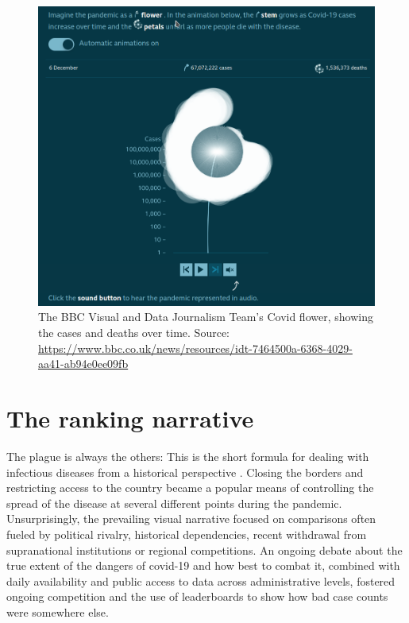 \documentclass[article]{jdssv}\usepackage[]{graphicx}\usepackage[]{xcolor}
\begin{document}
\begin{figure}
\centering
\includegraphics[width=.8\linewidth]{Figures_Web/BBC_flower_time_series}
\caption{The BBC Visual and Data Journalism Team's Covid flower, showing the cases and deaths over time. Source: \url{https://www.bbc.co.uk/news/resources/idt-7464500a-6368-4029-aa41-ab94e0ee09fb}}\label{fig:bbc-flower}
\end{figure}


\section{The ranking narrative}
\label{sec:rankings}

The plague is always the others: This is the short formula for dealing with infectious diseases from a historical perspective \citep{thiessen2021}. Closing the borders and restricting access to the country became a popular means of controlling the spread of the disease at several different points during the pandemic. Unsurprisingly, the prevailing visual narrative focused on comparisons often fueled by political rivalry, historical dependencies, recent withdrawal from supranational institutions or regional competitions. An ongoing debate about the true extent of the dangers of covid-19 and how best to combat it, combined with daily availability and public access to data across administrative levels, fostered ongoing competition and the use of leaderboards to show how bad case counts were somewhere else. 
\end{document}
